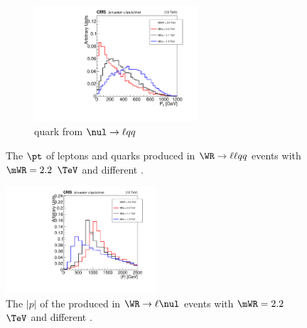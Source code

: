 \begin{figure}
\begin{subfigure}[t]{2.4in}
		\centering
		\includegraphics[width=2.4in]{figures/ptGenQuarkTwoFromScdHvyPtcl_MWR_2200_several_MNu_private.pdf}
		\caption{quark from $\nul \rightarrow \ell qq$}\label{fig:wrLeptQrkPtsVarMNud}
	\end{subfigure}
	\caption{The $\pt$ of leptons and quarks produced in $\WR \rightarrow \ell\ell qq$ events with $\mWR = 2.2$ $\TeV$ 
		and different \mnul.}\label{fig:wrLeptQrkPtsVarMNu}
\end{figure}

\begin{figure}[h]
	\centering
	\includegraphics[width=0.5\textwidth]{figures/genNuMomMag_MWR_2200_several_MNu_private.pdf}
	\caption{The $|p|$ of the \nul produced in $\WR \rightarrow \ell\nul$ events with $\mWR = 2.2$ $\TeV$ and different \mnul.}
	\label{fig:hvyNuMomentumVarMNu}
\end{figure}

